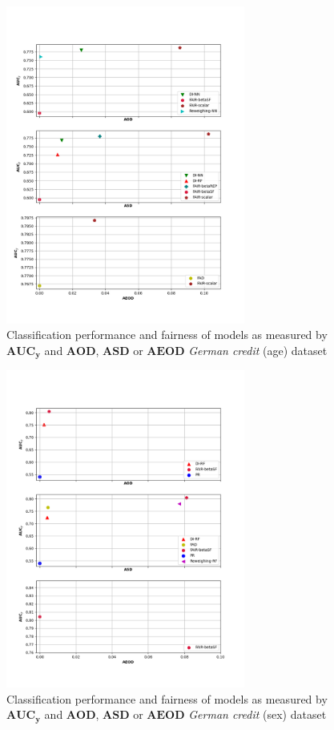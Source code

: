 \documentclass[preprint,12pt]{elsarticle}
\begin{document}
\begin{figure}
	\center
	\includegraphics[angle=0, width=0.7\textwidth]{Ger_age.png}
	\captionsetup{justification=centering}
	\caption{Classification performance and fairness of models as measured by $\mathbf{AUC_y}$ and $\mathbf{AOD}$, $\mathbf{ASD}$ or $\mathbf{AEOD}$ \textit{German credit} (age) dataset}
	\label{fig:Ger-sex-res}
	\vskip -0.2in
\end{figure}

\begin{figure}
	\center
	\includegraphics[angle=0, width=0.7\textwidth]{Ger_sex.png}
	\captionsetup{justification=centering}
	\caption{Classification performance and fairness of models as measured by $\mathbf{AUC_y}$ and $\mathbf{AOD}$, $\mathbf{ASD}$ or $\mathbf{AEOD}$ \textit{German credit} (sex) dataset}
	\label{fig:Ger-age-res}
	\vskip -0.2in
\end{figure}
\end{document}
